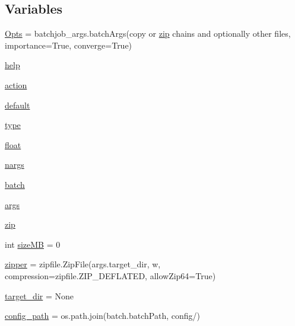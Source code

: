 \subsection*{Variables}
\begin{DoxyCompactItemize}
\item 
\mbox{\hyperlink{namespacecopyGridFiles_a8e32722202dac7526ba32c782748aa57}{Opts}} = batchjob\+\_\+args.\+batch\+Args(\textquotesingle{}copy or \mbox{\hyperlink{namespacecopyGridFiles_a38812b03b16820ac90fe801ed09b0a61}{zip}} chains and optionally other files\textquotesingle{}, importance=True, converge=True)
\item 
\mbox{\hyperlink{namespacecopyGridFiles_ad85400736dae44a4b09933cbeb74b875}{help}}
\item 
\mbox{\hyperlink{namespacecopyGridFiles_ac3fe3ebe59c8bc2f632ded074462e3fb}{action}}
\item 
\mbox{\hyperlink{namespacecopyGridFiles_a506b899340aaabd1a945d540ec3bd046}{default}}
\item 
\mbox{\hyperlink{namespacecopyGridFiles_a2c76f8d2dcdba216154c55449d4bbadf}{type}}
\item 
\mbox{\hyperlink{namespacecopyGridFiles_a5c4237e11fcf27c3403cb75b29e1cced}{float}}
\item 
\mbox{\hyperlink{namespacecopyGridFiles_afb165627a6b92f9345e8ae5a3733df38}{nargs}}
\item 
\mbox{\hyperlink{namespacecopyGridFiles_acb6a33b9a8b9d3558fe7b99858778f48}{batch}}
\item 
\mbox{\hyperlink{namespacecopyGridFiles_adc04a6887d14595ef2a9d84f03caaad7}{args}}
\item 
\mbox{\hyperlink{namespacecopyGridFiles_a38812b03b16820ac90fe801ed09b0a61}{zip}}
\item 
int \mbox{\hyperlink{namespacecopyGridFiles_a392878fda6c6e7da4d3c0c21fccd72e2}{size\+MB}} = 0
\item 
\mbox{\hyperlink{namespacecopyGridFiles_a145a972869b1a7467b372117e7d1112a}{zipper}} = zipfile.\+Zip\+File(args.\+target\+\_\+dir, \textquotesingle{}w\textquotesingle{}, compression=zipfile.\+Z\+I\+P\+\_\+\+D\+E\+F\+L\+A\+T\+ED, allow\+Zip64=True)
\item 
\mbox{\hyperlink{namespacecopyGridFiles_adae9565fe8b5fe30d7005e3ed64f1c4f}{target\+\_\+dir}} = None
\item 
\mbox{\hyperlink{namespacecopyGridFiles_a94f73c7fe98852530442bbf232028c40}{config\+\_\+path}} = os.\+path.\+join(batch.\+batch\+Path, \textquotesingle{}config/\textquotesingle{})
\item 

\end{DoxyCompactItemize}
